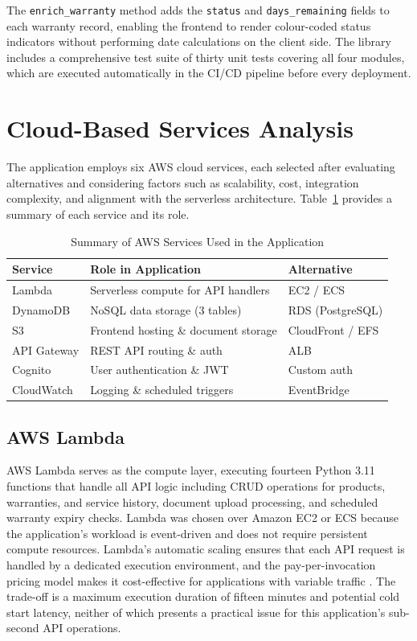 \documentclass[conference]{IEEEtran}
\begin{document}
The \texttt{enrich\_warranty} method adds the \texttt{status} and \texttt{days\_remaining} fields to each warranty record, enabling the frontend to render colour-coded status indicators without performing date calculations on the client side. The library includes a comprehensive test suite of thirty unit tests covering all four modules, which are executed automatically in the CI/CD pipeline before every deployment.

\section{Cloud-Based Services Analysis}

The application employs six AWS cloud services, each selected after evaluating alternatives and considering factors such as scalability, cost, integration complexity, and alignment with the serverless architecture. Table~\ref{tab:services} provides a summary of each service and its role.

\begin{table}[ht]
\centering
\caption{Summary of AWS Services Used in the Application}
\label{tab:services}
\scriptsize
\begin{tabularx}{\columnwidth}{l X l}
\toprule
\textbf{Service} & \textbf{Role in Application} & \textbf{Alternative} \\
\midrule
Lambda & Serverless compute for API handlers & EC2 / ECS \\
DynamoDB & NoSQL data storage (3 tables) & RDS (PostgreSQL) \\
S3 & Frontend hosting \& document storage & CloudFront / EFS \\
API Gateway & REST API routing \& auth & ALB \\
Cognito & User authentication \& JWT & Custom auth \\
CloudWatch & Logging \& scheduled triggers & EventBridge \\
\bottomrule
\end{tabularx}
\end{table}

\subsection{AWS Lambda}

AWS Lambda serves as the compute layer, executing fourteen Python 3.11 functions that handle all API logic including CRUD operations for products, warranties, and service history, document upload processing, and scheduled warranty expiry checks. Lambda was chosen over Amazon EC2 or ECS because the application's workload is event-driven and does not require persistent compute resources. Lambda's automatic scaling ensures that each API request is handled by a dedicated execution environment, and the pay-per-invocation pricing model makes it cost-effective for applications with variable traffic \cite{awslambda2024}. The trade-off is a maximum execution duration of fifteen minutes and potential cold start latency, neither of which presents a practical issue for this application's sub-second API operations.
\end{document}
